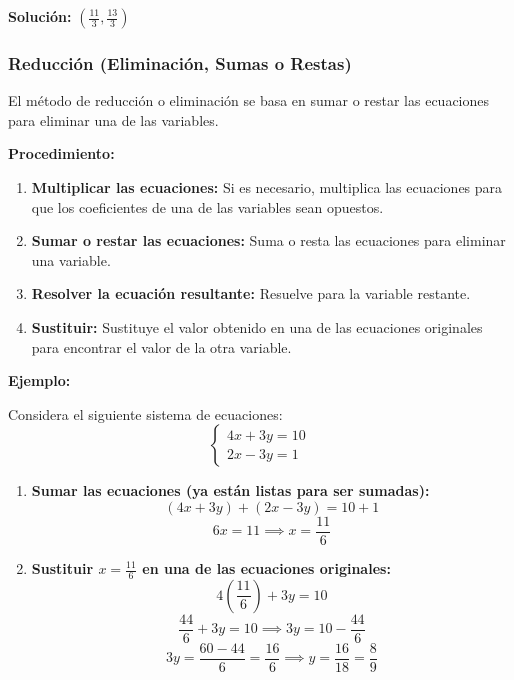     \textbf{Solución:} \( \left( \frac{11}{3}, \frac{13}{3} \right) \)
    
     
    
    \subsubsection{Reducción (Eliminación, Sumas o Restas)}
    
    El método de reducción o eliminación se basa en sumar o restar las ecuaciones para eliminar una de las variables.
    
    
    \textbf{Procedimiento:}
    \begin{enumerate}
        \item \textbf{Multiplicar las ecuaciones:} Si es necesario, multiplica las ecuaciones para que los coeficientes de una de las variables sean opuestos.
        \item \textbf{Sumar o restar las ecuaciones:} Suma o resta las ecuaciones para eliminar una variable.
        \item \textbf{Resolver la ecuación resultante:} Resuelve para la variable restante.
        \item \textbf{Sustituir:} Sustituye el valor obtenido en una de las ecuaciones originales para encontrar el valor de la otra variable.
    \end{enumerate}
    
    \textbf{Ejemplo:}
    
    Considera el siguiente sistema de ecuaciones:
    \[
    \begin{cases}
    4x + 3y = 10 \\
    2x - 3y = 1
    \end{cases}
    \]
    
    \begin{enumerate}
        \item \textbf{Sumar las ecuaciones (ya están listas para ser sumadas):}
            \[
            (4x + 3y) + (2x - 3y) = 10 + 1
            \]
            \[
            6x = 11 \implies x = \frac{11}{6}
            \]
        \item \textbf{Sustituir \(x = \frac{11}{6}\) en una de las ecuaciones originales:}
            \[
            4 \left(\frac{11}{6}\right) + 3y = 10
            \]
            \[
            \frac{44}{6} + 3y = 10 \implies 3y = 10 - \frac{44}{6}
            \]
            \[
            3y = \frac{60 - 44}{6} = \frac{16}{6} \implies y = \frac{16}{18} = \frac{8}{9}
            \]
    \end{enumerate}
    
